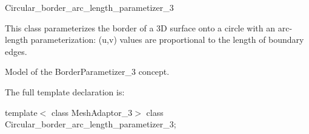 

\begin{ccRefClass}{Circular_border_arc_length_parametizer_3}  %


\ccDefinition


This class parameterizes the border of a 3D surface onto a circle with an arc-length parameterization: (u,v) values are proportional to the length of boundary edges.



\ccIsModel

Model of the BorderParametizer\_3 concept.



\ccParameters

The full template declaration is:

template$<$
class MeshAdaptor\_3$>$ 
class Circular\_border\_arc\_length\_parametizer\_3;


\ccTypes


{
}
{
}
{
}
{
}
{
}
{
}
{
}
{
}
{
}
{
}
{
}
{
}
{
}
{
}
{
}
{
}
{
}
{
}
{
}
{
}
{
}



\end{ccRefClass}
